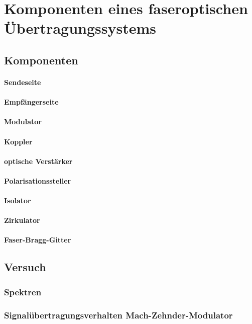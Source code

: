 \documentclass[a4paper]{article}
\begin{document}
\newpage
\section{Komponenten eines faseroptischen Übertragungssystems}
\subsection{Komponenten}
\paragraph{Sendeseite}
\paragraph{Empfängerseite}
\paragraph{Modulator}
\paragraph{Koppler}
\paragraph{optische Verstärker}
\paragraph{Polarisationssteller}
\paragraph{Isolator}
\paragraph{Zirkulator}
\paragraph{Faser-Bragg-Gitter}

\subsection{Versuch}
\subsubsection{Spektren}
\subsubsection{Signalübertragungsverhalten Mach-Zehnder-Modulator}
\end{document}
